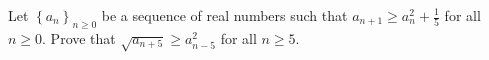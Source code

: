 Let $\left\{a_n\right\}_{n\geq0}$ be a sequence of real numbers such that $a_{n+1}\geq a_n^2+\frac{1}{5}$ for all $n\geq0$. Prove that $\sqrt{a_{n+5}}\geq a_{n-5}^2$ for all $n\geq5$.